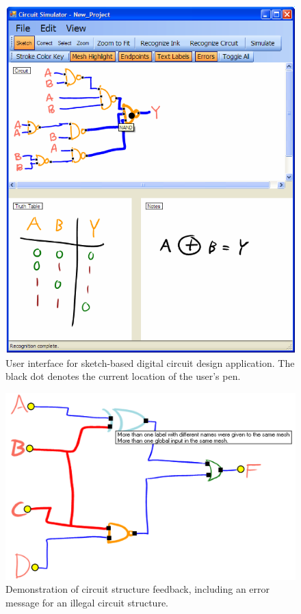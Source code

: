 \documentclass{elsart}
\begin{document}
\begin{figure}[tb]
  \centering
  \includegraphics[width=1.0\linewidth]{summerGUI-with-dot.png}
  \caption{\label{fig:newGUI} User interface for sketch-based digital
         	circuit design application.  The black dot denotes the
         	current location of the user's pen. }
\end{figure}

\begin{figure}[tb]
  \centering
  \includegraphics[width=.85\linewidth]{circuitRec-error-screengrab.png}
  \caption{\label{fig:circuitRecErrorDemo} Demonstration of circuit
           structure feedback, including an error message for an
           illegal circuit structure.}
\end{figure}
\end{document}
